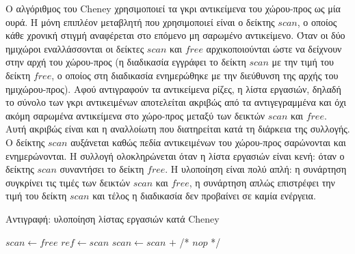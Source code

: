 \begin{greek}
Ο αλγόριθμος του Cheney \cite{DBLP:journals/cacm/Cheney70} χρησιμοποιεί
τα γκρι αντικείμενα του χώρου-προς ως μία ουρά. Η μόνη επιπλέον
μεταβλητή που χρησιμοποιεί είναι ο δείκτης $scan$, ο οποίος κάθε
χρονική στιγμή αναφέρεται στο επόμενο μη σαρωμένο αντικείμενο.
Όταν οι δύο ημιχώροι εναλλάσσονται οι δείκτες $scan$ και $free$
αρχικοποιούνται ώστε να δείχνουν στην αρχή του χώρου-προς (η
διαδικασία  εγγράφει το δείκτη $scan$ με
την τιμή του δείκτη $free$, ο οποίος στη διαδικασία 
ενημερώθηκε με την διεύθυνση της αρχής του ημιχώρου-προς).
Αφού αντιγραφούν τα αντικείμενα ρίζες, η λίστα εργασιών, δηλαδή
το σύνολο των γκρι αντικειμένων αποτελείται ακριβώς από τα
αντιγεγραμμένα και όχι ακόμη σαρωμένα αντικείμενα στο χώρο-προς
μεταξύ των δεικτών $scan$ και $free$. Αυτή ακριβώς είναι και η
αναλλοίωτη που διατηρείται κατά τη διάρκεια της συλλογής. Ο
δείκτης $scan$ αυξάνεται καθώς πεδία αντικειμένων του χώρου-προς
σαρώνονται και ενημερώνονται. Η συλλογή ολοκληρώνεται όταν η
λίστα εργασιών είναι κενή: όταν ο δείκτης $scan$ συναντήσει το
δείκτη $free$. Η υλοποίηση είναι πολύ απλή: η συνάρτηση 
συγκρίνει τις τιμές των δεικτών $scan$ και $free$, η συνάρτηση
 απλώς επιστρέφει την τιμή του δείκτη $scan$
και τέλος η διαδικασία  δεν προβαίνει σε καμία
ενέργεια.

\begin{algorithm}[H]
  \caption{Αντιγραφή: υλοποίηση λίστας εργασιών κατά Cheney}
  \label{alg:c_3}
  \begin{algorithmic}[1]
      \State $scan \gets free$
    \EndProcedure
    \Statex
      \State {}
    \EndFunction
    \Statex
      \State $ref \gets scan$
      \State $scan \gets scan$ $+$ 
      \State {}
    \EndFunction
    \Statex
      \State /* $nop$ */
    \EndProcedure
  \end{algorithmic}
\end{algorithm}


\end{greek}
